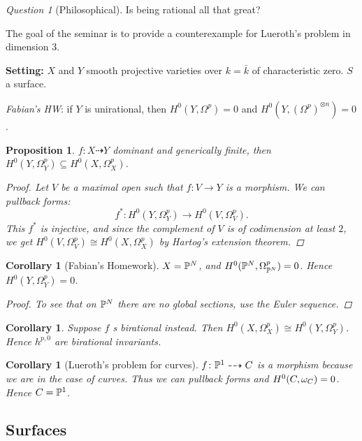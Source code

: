 \documentclass[A4paper, british]{amsart}
\theoremstyle{darkgreentheorem}
\newtheorem{prop}[thm]{Proposition}
\newtheorem{cor}[thm]{Corollary}
\theoremstyle{darkbluedefinition}
\theoremstyle{darkredexample}
\theoremstyle{remark}
\newtheorem{q}[thm]{Question}
\newcommand{\1}{\mathbbm{1}}
\newcommand{\ot}{\otimes}
\newcommand{\sub}{\subseteq}
\begin{document}
\begin{q}[Philosophical]
    Is being rational all that great?
\end{q}

The goal of the seminar is to provide a counterexample for Lueroth's problem in dimension $3$.

\textbf{Setting:}
$X$ and $Y$ smooth projective varieties over $k=\bar{k}$ of characteristic zero.
$S$ a surface.

\textit{Fabian's HW}: if $Y$ is unirational, then $H^{0}(Y, \Omega^{p})=0$ and $H^{0}(Y,(\Omega^{p})^{\ot n})=0$.

\begin{prop}
    $f\colon X\dashrightarrow Y$ dominant and generically finite, then $H^{0}(Y,\Omega_{Y}^{p})\sub H^{0}(X,\Omega_{X}^{p})$.
    \begin{proof}
	Let $V$ be a maximal open such that $f\colon V\to Y$ is a morphism.
	We can pullback forms:
	\[ f^{*}\colon H^{0}(Y,\Omega_{Y}^{p})\to H^{0}(V,\Omega_{V}^{p}). \]
	This $f^{*}$ is injective, and since the complement of $V$ is of codimension at least $2$, we get $H^{0}(V,\Omega_{V}^{p})\cong H^{0}(X,\Omega_{X}^{p})$ by Hartog's extension theorem.
    \end{proof}
\end{prop}

\begin{cor}[Fabian's Homework]
    $X=\P^{N}$, and $H^{0}(\P^{N},\Omega_{\P^{N}}^{p})=0$.
    Hence $H^{0}(Y,\Omega_{Y}^{p})=0$.
    \begin{proof}
	To see that on $\P^{N}$ there are no global sections, use the Euler sequence.
    \end{proof}
\end{cor}

\begin{cor}
    Suppose $f$ s birational instead.
    Then $H^{0}(X,\Omega_{X}^{p})\cong H^{0}(Y,\Omega_{Y}^{p})$.
    Hence $h^{p,0}$ are birational invariants.
\end{cor}

\begin{cor}[Lueroth's problem for curves]
    $f\colon \P^{1}\dashrightarrow C$ is a morphism because we are in the case of curves.
    Thus we can pullback forms and $H^{0}(C,\w_{C})=0$.
    Hence $C=\P^{1}$.
\end{cor}

\subsection{Surfaces}
\end{document}
